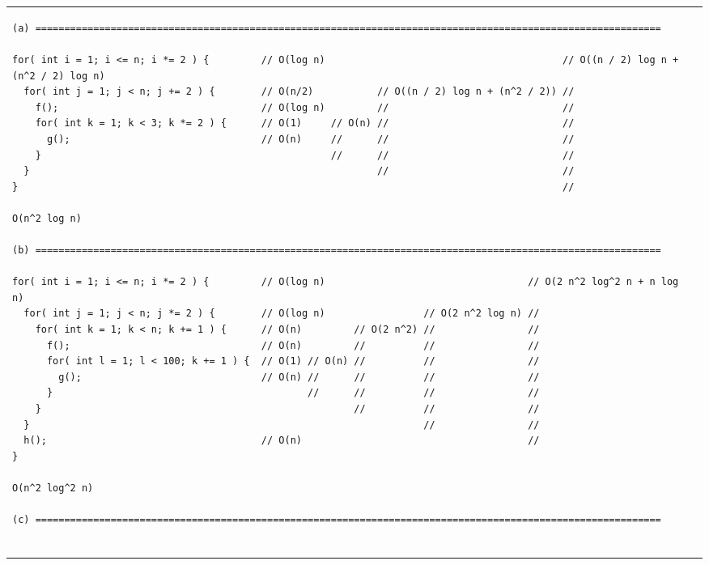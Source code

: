 \documentclass[10pt]{article}
\begin{document}
\begin{enumerate}
\begin{scriptsize}
\begin{tabular}{ll}
\begin{minipage}{3in}
\begin{verbatim}
(a) ============================================================================================================

for( int i = 1; i <= n; i *= 2 ) {         // O(log n)                                         // O((n / 2) log n + (n^2 / 2) log n)
  for( int j = 1; j < n; j += 2 ) {        // O(n/2)           // O((n / 2) log n + (n^2 / 2)) //
    f();                                   // O(log n)         //                              //
    for( int k = 1; k < 3; k *= 2 ) {      // O(1)     // O(n) //                              //
      g();                                 // O(n)     //      //                              //
    }                                                  //      //                              //
  }                                                            //                              //
}                                                                                              //

O(n^2 log n)

(b) ============================================================================================================

for( int i = 1; i <= n; i *= 2 ) {         // O(log n)                                   // O(2 n^2 log^2 n + n log n)
  for( int j = 1; j < n; j *= 2 ) {        // O(log n)                 // O(2 n^2 log n) //
    for( int k = 1; k < n; k += 1 ) {      // O(n)         // O(2 n^2) //                //
      f();                                 // O(n)         //          //                //
      for( int l = 1; l < 100; k += 1 ) {  // O(1) // O(n) //          //                //
        g();                               // O(n) //      //          //                //
      }                                            //      //          //                //
    }                                                      //          //                //
  }                                                                    //                //
  h();                                     // O(n)                                       //
}

O(n^2 log^2 n)

(c) ============================================================================================================


\end{verbatim}
\end{minipage}
\end{tabular}
\end{scriptsize}
\end{enumerate}
\end{document}
